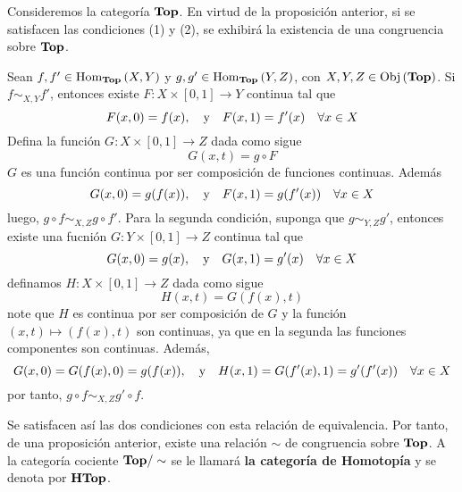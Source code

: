 \documentclass[12pt]{report}
\theoremstyle{largebreak}
\newcommand\cf[3]{\ensuremath{#1:#2\rightarrow#3}}
\newcommand{\Obj}[1]{\ensuremath{\textup{Obj}\left(#1\right)}}
\newcommand{\Hom}[3]{\ensuremath{\textup{Hom}_{#1}\left(#2,#3\right)}}
\newcommand{\Cat}[1]{\ensuremath{\textup{\textbf{#1}}}}
\begin{document}
    \begin{exa}
        Consideremos la categoría $\Cat{Top}$. En virtud de la proposición anterior, si se satisfacen las condiciones (1) y (2), se exhibirá la existencia de una congruencia sobre $\Cat{Top}$.

        Sean $f,f'\in\Hom{\Cat{Top}}{X}{Y}$ y $g,g'\in\Hom{\Cat{Top}}{Y}{Z}$, con $X,Y,Z\in\Obj{\Cat{Top}}$. Si $f\sim_{X,Y}f'$, entonces existe $\cf{F}{X\times[0,1]}{Y}$ continua tal que 
        \begin{equation*}
            F(x,0)=f(x),\quad\textup{y}\quad F(x,1)=f'(x)\quad\forall x\in X
        \end{equation*}
        Defina la función $\cf{G}{X\times[0,1]}{Z}$ dada como sigue
        \begin{equation*}
            G(x,t)=g\circ F
        \end{equation*}
        $G$ es una función continua por ser composición de funciones continuas. Además
        \begin{equation*}
            G(x,0)=g(f(x)),\quad\textup{y}\quad F(x,1)=g(f'(x))\quad\forall x\in X
        \end{equation*}
        luego, $g\circ f\sim_{X,Z}g\circ f'$. Para la segunda condición, suponga que $g\sim_{Y,Z}g'$, entonces existe una fucnión $\cf{G}{Y\times[0,1]}{Z}$ continua tal que
        \begin{equation*}
            G(x,0)=g(x),\quad\textup{y}\quad G(x,1)=g'(x)\quad\forall x\in X
        \end{equation*}
        definamos $\cf{H}{X\times[0,1]}{Z}$ dada como sigue
        \begin{equation*}
            H(x,t)=G(f(x),t)
        \end{equation*}
        note que $H$ es continua por ser composición de $G$ y la función $(x,t)\mapsto(f(x),t)$ son continuas, ya que en la segunda las funciones componentes son continuas. Además,
        \begin{equation*}
            G(x,0)=G(f(x),0)=g(f(x)),\quad\textup{y}\quad H(x,1)=G(f'(x),1)=g'(f'(x))\quad\forall x\in X
        \end{equation*}
        por tanto, $g\circ f\sim_{X,Z}g'\circ f$.

        Se satisfacen así las dos condiciones con esta relación de equivalencia. Por tanto, de una proposición anterior, existe una relación $\sim$ de congruencia sobre $\Cat{Top}$. A la categoría cociente $\Cat{Top}/\sim$ se le llamará \textbf{la categoría de Homotopía} y se denota por $\Cat{HTop}$. 
    \end{exa}
\end{document}

